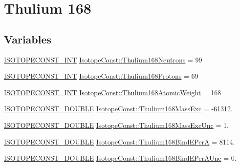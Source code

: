 \hypertarget{group___isotope_const-_thulium-_tm168}{}\section{Thulium 168}
\label{group___isotope_const-_thulium-_tm168}
\subsection*{Variables}
\begin{DoxyCompactItemize}
\item 
\mbox{\hyperlink{group___isotope_const-_macros_ga5f18360b3e99483a35c32d789e62621c}{I\+S\+O\+T\+O\+P\+E\+C\+O\+N\+S\+T\+\_\+\+I\+NT}} \mbox{\hyperlink{group___isotope_const-_thulium-_tm168_ga32f616d14a432f9cbba7de4f7cce6c15}{Isotope\+Const\+::\+Thulium168\+Neutrons}} = 99
\item 
\mbox{\hyperlink{group___isotope_const-_macros_ga5f18360b3e99483a35c32d789e62621c}{I\+S\+O\+T\+O\+P\+E\+C\+O\+N\+S\+T\+\_\+\+I\+NT}} \mbox{\hyperlink{group___isotope_const-_thulium-_tm168_ga890eaf12ff9b19cf6ff48aa18eb23816}{Isotope\+Const\+::\+Thulium168\+Protons}} = 69
\item 
\mbox{\hyperlink{group___isotope_const-_macros_ga5f18360b3e99483a35c32d789e62621c}{I\+S\+O\+T\+O\+P\+E\+C\+O\+N\+S\+T\+\_\+\+I\+NT}} \mbox{\hyperlink{group___isotope_const-_thulium-_tm168_gab826a99ddeaf2f0c3f2d0aa86946a1d4}{Isotope\+Const\+::\+Thulium168\+Atomic\+Weight}} = 168
\item 
\mbox{\hyperlink{group___isotope_const-_macros_ga8f45a7272ce02c0b4c65c44636ed719a}{I\+S\+O\+T\+O\+P\+E\+C\+O\+N\+S\+T\+\_\+\+D\+O\+U\+B\+LE}} \mbox{\hyperlink{group___isotope_const-_thulium-_tm168_ga745098a6810c1213a83bd892459c9b00}{Isotope\+Const\+::\+Thulium168\+Mass\+Exc}} = -\/61312.
\item 
\mbox{\hyperlink{group___isotope_const-_macros_ga8f45a7272ce02c0b4c65c44636ed719a}{I\+S\+O\+T\+O\+P\+E\+C\+O\+N\+S\+T\+\_\+\+D\+O\+U\+B\+LE}} \mbox{\hyperlink{group___isotope_const-_thulium-_tm168_gac2d93e25b54685275104f9dd5c050c6e}{Isotope\+Const\+::\+Thulium168\+Mass\+Exc\+Unc}} = 1.
\item 
\mbox{\hyperlink{group___isotope_const-_macros_ga8f45a7272ce02c0b4c65c44636ed719a}{I\+S\+O\+T\+O\+P\+E\+C\+O\+N\+S\+T\+\_\+\+D\+O\+U\+B\+LE}} \mbox{\hyperlink{group___isotope_const-_thulium-_tm168_ga88b4a1e841ef61bc92d4112736ffbc90}{Isotope\+Const\+::\+Thulium168\+Bind\+E\+PerA}} = 8114.
\item 
\mbox{\hyperlink{group___isotope_const-_macros_ga8f45a7272ce02c0b4c65c44636ed719a}{I\+S\+O\+T\+O\+P\+E\+C\+O\+N\+S\+T\+\_\+\+D\+O\+U\+B\+LE}} \mbox{\hyperlink{group___isotope_const-_thulium-_tm168_gab461a55057661bfa27148c58b133420e}{Isotope\+Const\+::\+Thulium168\+Bind\+E\+Per\+A\+Unc}} = 0.

\end{DoxyCompactItemize}
